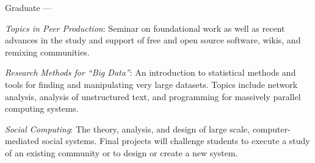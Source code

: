 \documentclass[10pt]{memoir}
\newenvironment{enumerate*}%
  {\begin{enumerate}%
    \setlength{\itemsep}{0pt}%
    \setlength{\parskip}{0pt}}%
  {\end{enumerate}}
\begin{document}
Graduate ---
\begin{enumerate*}
\item \emph{Topics in Peer Production}: Seminar on foundational work
  as well as recent advances in the study and support of free and open
  source software, wikis, and remixing communities.
\item \emph{Research Methods for ``Big Data''}: An introduction to
  statistical methods and tools for finding and manipulating very
  large datasets. Topics include network analysis, analysis of
  unstructured text, and programming for massively parallel computing
  systems.
\item \emph{Social Computing}: The theory, analysis, and design of
  large scale, computer-mediated social systems. Final projects will
  challenge students to execute a study of an existing community or to
  design or create a new system.
\end{enumerate*}
\end{document}
